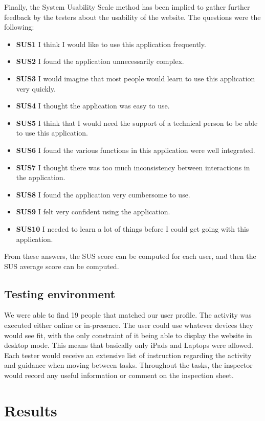 Finally, the System Usability Scale method has been implied to gather further feedback by the testers about the usability of the website. The questions were the following:
\begin{itemize}
	\item \textbf{SUS1} I think I would like to use this application frequently.
	\item \textbf{SUS2} I found the application unnecessarily complex.
	\item \textbf{SUS3} I would imagine that most people would learn to use this application very quickly.
	\item \textbf{SUS4} I thought the application was easy to use.
	\item \textbf{SUS5} I think that I would need the support of a technical person to be able to use this application.
	\item \textbf{SUS6} I found the various functions in this application were well integrated.
	\item \textbf{SUS7} I thought there was too much inconsistency between interactions in the application.
	\item \textbf{SUS8} I found the application very cumbersome to use.
	\item \textbf{SUS9} I felt very confident using the application.
	\item \textbf{SUS10} I needed to learn a lot of things before I could get going with this application.
\end{itemize}

From these answers, the SUS score can be computed for each user, and then the SUS average score can be computed.

\subsection{Testing environment}
We were able to find 19 people that matched our user profile. The activity was executed either online or in-presence. The user could use whatever devices they would see fit, with the only constraint of it being able to display the website in desktop mode. This means that basically only iPads and Laptops were allowed. Each tester would receive an extensive list of instruction regarding the activity and guidance when moving between tasks. Throughout the tasks, the inspector would record any useful information or comment on the inspection sheet.

\section{Results}
